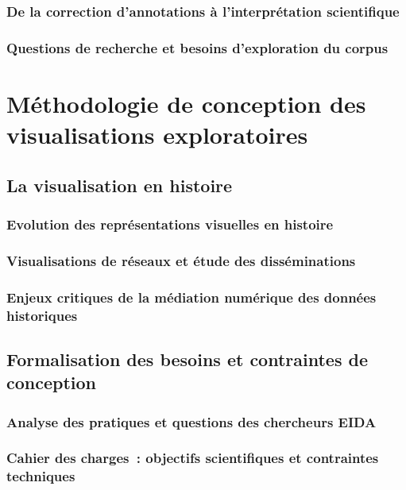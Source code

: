 \documentclass[a4paper,12pt,twoside]{book}
\newcommand{\clearemptydoublepage}{\newpage{\pagestyle{empty}\cleardoublepage}}
\begin{document}
	\section{De la correction d'annotations à l'interprétation scientifique}

	\section{Questions de recherche et besoins d'exploration du corpus}

	\clearemptydoublepage

	\part{Méthodologie de conception des visualisations exploratoires}
	\chapter{La visualisation en histoire}
	\section{Evolution des représentations visuelles en histoire}

	\section{Visualisations de réseaux et étude des disséminations}

	\section{Enjeux critiques de la médiation numérique des données historiques}

	\clearemptydoublepage

	\chapter{Formalisation des besoins et contraintes de conception}
	\section{Analyse des pratiques et questions des chercheurs EIDA}

	\section{Cahier des charges~: objectifs scientifiques et contraintes techniques}
\end{document}
